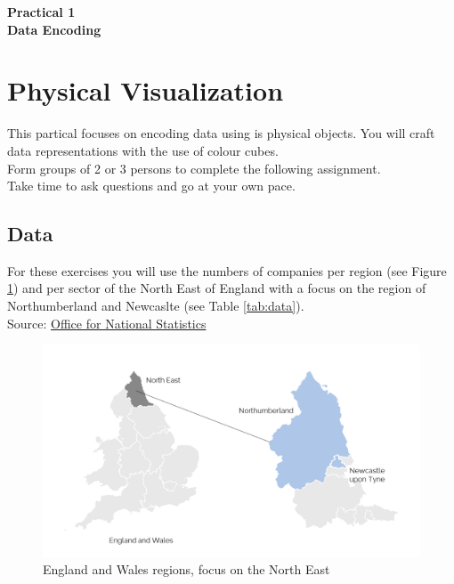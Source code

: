 \documentclass[11pt]{article}
\begin{document}
\pagestyle{fancy}
\renewcommand{\headrulewidth}{0pt}
\fancyfoot[L]{\thepage}
\fancyfoot[C]{}

\begin{center}
\vspace*{1cm}
{\textbf {\Huge Practical 1}}\\
\vspace*{0.5cm}
{\textbf {\huge Data Encoding}}
\vspace*{1cm}
\end{center}

\section{Physical Visualization}

This partical focuses on encoding data using is physical objects. You will craft data representations with the use of colour cubes.\\

Form groups of 2 or 3 persons to complete the following assignment.\\

Take time to ask questions and go at your own pace.

\subsection*{Data}

For these exercises you will use the numbers of companies per region (see Figure \ref{fig:map}) and per sector of the North East of England with a focus on the region of Northumberland and Newcaslte (see Table \ref{tab:data}).\\
Source: \href{https://www.ons.gov.uk/businessindustryandtrade/business/activitysizeandlocation/datasets/ukbusinessactivitysizeandlocation}{Office for National Statistics}\\

\begin{figure}[h!]
    \centering
    \includegraphics[width=.8\columnwidth]{img/NEmap.png}
    \caption{England and Wales regions, focus on the North East}
    \label{fig:map}
\end{figure}
\end{document}
